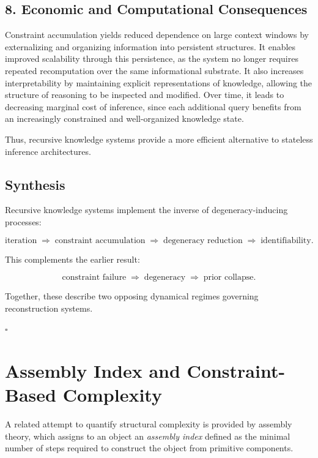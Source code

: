 \documentclass[12pt, oneside]{article}
\theoremstyle{plain}
\theoremstyle{definition}
\theoremstyle{remark}
\begin{document}
\subsection{8. Economic and Computational Consequences}

Constraint accumulation yields reduced dependence on large context windows by externalizing and organizing information into persistent structures. It enables improved scalability through this persistence, as the system no longer requires repeated recomputation over the same informational substrate. It also increases interpretability by maintaining explicit representations of knowledge, allowing the structure of reasoning to be inspected and modified. Over time, it leads to decreasing marginal cost of inference, since each additional query benefits from an increasingly constrained and well-organized knowledge state.

Thus, recursive knowledge systems provide a more efficient alternative to stateless inference architectures.

\subsection{Synthesis}

Recursive knowledge systems implement the inverse of degeneracy-inducing processes:

\[
\text{iteration} \;\Rightarrow\; \text{constraint accumulation} \;\Rightarrow\; \text{degeneracy reduction} \;\Rightarrow\; \text{identifiability}.
\]

This complements the earlier result:

\[
\text{constraint failure} \;\Rightarrow\; \text{degeneracy} \;\Rightarrow\; \text{prior collapse}.
\]

Together, these describe two opposing dynamical regimes governing reconstruction systems.

\hfill $\square$

\section{Assembly Index and Constraint-Based Complexity}

A related attempt to quantify structural complexity is provided by assembly theory,
which assigns to an object an \emph{assembly index} defined as the minimal number
of steps required to construct the object from primitive components.
\end{document}
